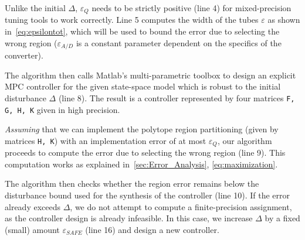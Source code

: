 
Unlike the initial $\Delta$, $\varepsilon_Q$ needs to be strictly positive (line 4)
for mixed-precision tuning tools to work correctly.
Line 5 computes the width of the tubes $\varepsilon$ as shown in~\autoref{eq:epsilontot},
which will be used to bound the error due to selecting the wrong region
($\varepsilon_{A/D}$ is a constant parameter dependent on the specifics of the
converter).

The algorithm then calls Matlab's multi-parametric toolbox to design an explicit
MPC controller for the given state-space model which is robust to the initial
disturbance $\Delta$ (line 8). The result is a controller represented by four matrices
\texttt{F, G, H, K} given in high precision.

\emph{Assuming} that we can implement the polytope region partitioning (given by
matrices \texttt{H, K}) with an implementation error of at most $\varepsilon_Q$,
our algorithm proceeds to compute the error due to selecting the wrong region (line 9).
This computation works as explained in~\autoref{sec:Error_Analysis}, \autoref{eq:maximization}.



The algorithm then checks whether the region error remains below the disturbance
bound used for the synthesis of the controller (line 10). 
If the error already exceeds $\Delta$, we do not attempt to compute a finite-precision
assignment, as the controller design is already infeasible.
In this case, we increase $\Delta$ by a fixed (small) amount $\varepsilon_{SAFE}$ (line 16) and 
design a new controller. 

